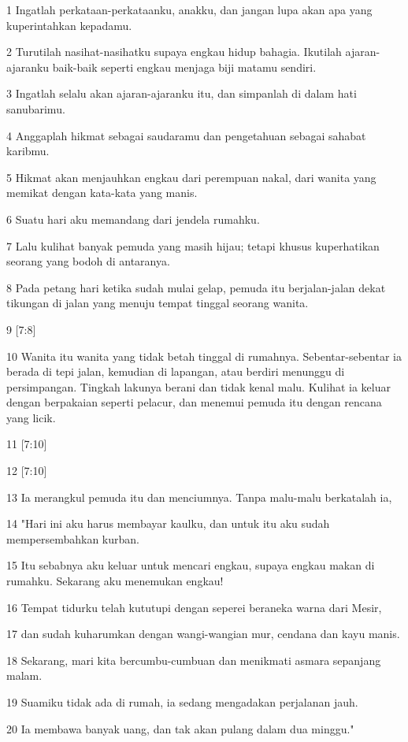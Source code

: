 \par 1 Ingatlah perkataan-perkataanku, anakku, dan jangan lupa akan apa yang kuperintahkan kepadamu.
\par 2 Turutilah nasihat-nasihatku supaya engkau hidup bahagia. Ikutilah ajaran-ajaranku baik-baik seperti engkau menjaga biji matamu sendiri.
\par 3 Ingatlah selalu akan ajaran-ajaranku itu, dan simpanlah di dalam hati sanubarimu.
\par 4 Anggaplah hikmat sebagai saudaramu dan pengetahuan sebagai sahabat karibmu.
\par 5 Hikmat akan menjauhkan engkau dari perempuan nakal, dari wanita yang memikat dengan kata-kata yang manis.
\par 6 Suatu hari aku memandang dari jendela rumahku.
\par 7 Lalu kulihat banyak pemuda yang masih hijau; tetapi khusus kuperhatikan seorang yang bodoh di antaranya.
\par 8 Pada petang hari ketika sudah mulai gelap, pemuda itu berjalan-jalan dekat tikungan di jalan yang menuju tempat tinggal seorang wanita.
\par 9 [7:8]
\par 10 Wanita itu wanita yang tidak betah tinggal di rumahnya. Sebentar-sebentar ia berada di tepi jalan, kemudian di lapangan, atau berdiri menunggu di persimpangan. Tingkah lakunya berani dan tidak kenal malu. Kulihat ia keluar dengan berpakaian seperti pelacur, dan menemui pemuda itu dengan rencana yang licik.
\par 11 [7:10]
\par 12 [7:10]
\par 13 Ia merangkul pemuda itu dan menciumnya. Tanpa malu-malu berkatalah ia,
\par 14 "Hari ini aku harus membayar kaulku, dan untuk itu aku sudah mempersembahkan kurban.
\par 15 Itu sebabnya aku keluar untuk mencari engkau, supaya engkau makan di rumahku. Sekarang aku menemukan engkau!
\par 16 Tempat tidurku telah kututupi dengan seperei beraneka warna dari Mesir,
\par 17 dan sudah kuharumkan dengan wangi-wangian mur, cendana dan kayu manis.
\par 18 Sekarang, mari kita bercumbu-cumbuan dan menikmati asmara sepanjang malam.
\par 19 Suamiku tidak ada di rumah, ia sedang mengadakan perjalanan jauh.
\par 20 Ia membawa banyak uang, dan tak akan pulang dalam dua minggu."
